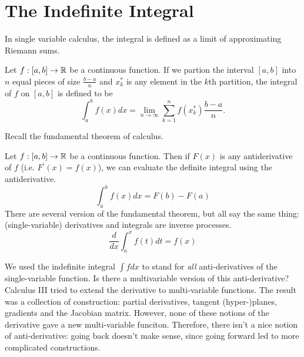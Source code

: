 \documentclass[fleqn,letterpaper]{report}
\begin{document}
\section{The Indefinite Integral}
\label{indefinite-integral}

In single variable calculus, the integral is defined as a
limit of approximating Riemann sums.

\begin{defn}
Let $f: [a,b] \rightarrow \mathbb{R}$ be a continuous function. 
If we partion the interval $[a,b]$ into $n$ equal pieces of
size $\frac{b-a}{n}$ and $x_k^*$ is any element in the $k$th
partition, the integral of $f$ on $[a,b]$ is defined to be
\begin{equation*}
\int_a^b f(x) dx = \lim_{n \rightarrow \infty} \sum_{k=1}^n
f(x_k^*) \frac{b-a}{n}.
\end{equation*}
\end{defn}

Recall the fundamental theorem of calculus. 

\begin{thm}
Let $f: [a,b] \rightarrow \mathbb{R}$ be a continuous function. Then
if $F(x)$ is any antiderivative of $f$ (i.e. $F^\prime(x) =
f(x)$), we can evaluate the definite integral using the
antiderivative.
\begin{equation*}
\int_a^b f(x) dx = F(b) - F(a)
\end{equation*}
There are several version of the fundamental theorem, but all
say the same thing: (single-variable) derivatives and
integrals are inverse processes.
\begin{equation*}
\frac{d}{dx} \int_a^x f(t) dt = f(x)
\end{equation*}
\end{thm}

We used the indefinite integral $\int f dx$ to stand for
\emph{all} anti-derivatives of the single-variable function.
Is there a multivariable version of this anti-derivative?
Calculus III tried to extend the derivative to multi-variable
functions. The result was a collection of construction:
partial derivatives, tangent (hyper-)planes, gradients and the
Jacobian matrix. However, none of these notions of the
derivative gave a new multi-variable funciton. Therefore,
there isn't a nice notion of anti-derivative: going back
doesn't make sense, since going forward led to more
complicated constructions.
\end{document}
